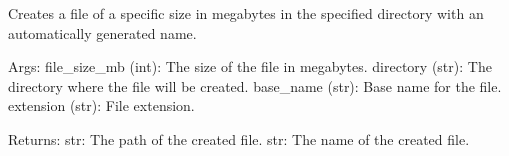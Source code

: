 \documentclass[letterpaper,10pt,english]{sphinxmanual}
\begin{document}

\begin{fulllineitems}
\label{\detokenize{utils:utils.file_management.create_file}}
\pysigstartsignatures
{}
\pysigstopsignatures
\sphinxAtStartPar
Creates a file of a specific size in megabytes in the specified directory with an automatically generated name.

\sphinxAtStartPar
Args:
file\_size\_mb (int): The size of the file in megabytes.
directory (str): The directory where the file will be created.
base\_name (str): Base name for the file.
extension (str): File extension.

\sphinxAtStartPar
Returns:
str: The path of the created file.
str: The name of the created file.

\end{fulllineitems}

\end{document}
